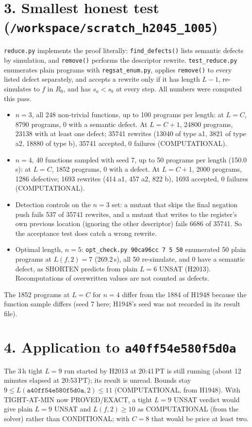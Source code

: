 \documentclass[11pt]{article}
\begin{document}
\section*{3. Smallest honest test (\texttt{/workspace/scratch\_h2045\_1005})}
\texttt{reduce.py} implements the proof literally: \texttt{find\_defects()} lists semantic defects by simulation, and \texttt{remove()} performs the descriptor rewrite. \texttt{test\_reduce.py} enumerates plain programs with \texttt{regsat\_enum.py}, applies \texttt{remove()} to every listed defect separately, and accepts a rewrite only if it has length $L-1$, re-simulates to $f$ in $R_0$, and has $s_a<s_b$ at every step. All numbers were computed this pass.
\begin{itemize}
\item $n=3$, all 248 non-trivial functions, up to 100 programs per length: at $L=C$, 8790 programs, 0 with a semantic defect. At $L=C+1$, 24800 programs, 23138 with at least one defect; 35741 rewrites (13040 of type a1, 3821 of type a2, 18880 of type b), 35741 accepted, 0 failures (COMPUTATIONAL).
\item $n=4$, 40 functions sampled with seed 7, up to 50 programs per length (150.0\,s): at $L=C$, 1852 programs, 0 with a defect. At $L=C+1$, 2000 programs, 1286 defective; 1693 rewrites (414 a1, 457 a2, 822 b), 1693 accepted, 0 failures (COMPUTATIONAL).
\item Detection controls on the $n=3$ set: a mutant that skips the final negation push fails 537 of 35741 rewrites, and a mutant that writes to the register's own previous location (ignoring the other descriptor) fails 6686 of 35741. So the acceptance test does catch a wrong rewrite.
\item Optimal length, $n=5$: \texttt{opt\_check.py 90ca96cc 7 5 50} enumerated 50 plain programs at $L(f,2)=7$ (269.2\,s), all 50 re-simulate, and 0 have a semantic defect, as SHORTEN predicts from plain $L=6$ UNSAT (H2013). Recomputations of overwritten values are not counted as defects.
\end{itemize}
The 1852 programs at $L=C$ for $n=4$ differ from the 1884 of H1948 because the function sample differs (seed 7 here; H1948's seed was not recorded in its result file).

\section*{4. Application to \texttt{a40ff54e580f5d0a}}
The 3\,h tight $L=9$ run started by H2013 at 20:41\,PT is still running (about 12 minutes elapsed at 20:53\,PT); its result is unread. Bounds stay $9\le L(\texttt{a40ff54e580f5d0a},2)\le 11$ (COMPUTATIONAL, from H1948). With TIGHT-AT-MIN now PROVED/EXACT, a tight $L=9$ UNSAT verdict would give plain $L=9$ UNSAT and $L(f,2)\ge 10$ as COMPUTATIONAL (from the solver) rather than CONDITIONAL; with $C=8$ that would be price at least two.
\end{document}
